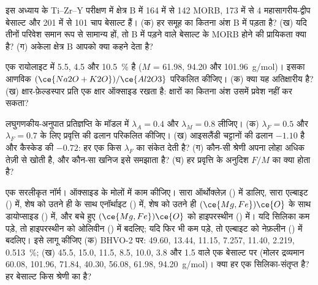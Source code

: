 \begin{exercise}[$\star\star$]\label{exo:b2:magmatic-series:8}
इस अध्याय के Ti--Zr--Y परीक्षण में क्षेत्र B में 164 में से 142 MORB, 173 में से 4
महासागरीय-द्वीप बेसाल्ट और 201 में से 101 चाप बेसाल्ट हैं। (क) हर समूह का कितना अंश
B में पड़ता है? (ख) यदि तीनों परिवेश समान रूप से सामान्य हों, तो B में पड़ने वाले बेसाल्ट के MORB होने की
प्रायिकता क्या है? (ग) अकेला क्षेत्र B आपको क्या कहने देता है?
\end{exercise}

\begin{exercise}[$\star\star$]\label{exo:b2:magmatic-series:9}
एक रायोलाइट में  5.5,  4.5 और  \qty{10.5}{\percent} है ($M$ =
61.98, 94.20 और \qty{101.96}{g/mol})। इसका आणविक $(\ce{Na2O +
K2O})/\ce{Al2O3}$ परिकलित कीजिए। (क) क्या यह अतिक्षारीय है? (ख) क्षार-फ़ेल्डस्पार प्रति  एक
क्षार ऑक्साइड रखता है: क्षारों का कितना अंश उसमें प्रवेश नहीं कर सकता?
\end{exercise}

\begin{exercise}[$\star\star\star$]\label{exo:b2:magmatic-series:10}
लघुगणकीय-अनुपात प्रतिज्ञप्ति के मॉडल में $\lambda_A = 0.4$ और $\lambda_M =
0.8$ लीजिए। (क) $\lambda_F = 0.5$ और $\lambda_F =
0.7$ के लिए प्रवृत्ति की ढलान परिकलित कीजिए। (ख) आइसलैंडी चट्टानों की ढलान $-1.10$ है और कैस्केड की
$-0.72$: हर एक किस $\lambda_F$ का संकेत देती है? (ग) कौन-सी श्रेणी अपना लोहा अधिक तेज़ी से खोती है,
और कौन-सा खनिज इसे समझाता है? (घ) हर प्रवृत्ति के अनुदिश $F/M$ का क्या होता है?
\end{exercise}

\begin{exercise}[$\star\star\star$]\label{exo:b2:magmatic-series:11}
एक सरलीकृत नॉर्म। ऑक्साइड के मोलों में काम कीजिए। सारा  ऑर्थोक्लेज़
() में डालिए, सारा  एल्बाइट () में,
शेष  को उतने ही  के साथ एनॉर्थाइट () में,
शेष  को उतने ही $(\ce{Mg,Fe})\ce{O}$ के साथ डायोप्साइड
() में, और बचे हुए $(\ce{Mg,Fe})\ce{O}$ को हाइपरस्थीन
() में। यदि सिलिका कम पड़े, तो हाइपरस्थीन को ओलिवीन
() में बदलिए; यदि फिर भी कम पड़े, तो एल्बाइट को नेफ़लीन
() में बदलिए। इसे लागू कीजिए (क) BHVO-2 पर:  49.60,  13.44,
 11.15,  7.257,  11.40,  2.219, 
\qty{0.513}{\percent}; (ख) 45.5, 15.0, 11.5, 8.5, 10.0, 3.8 और 1.5 वाले एक बेसाल्ट पर (मोलर
द्रव्यमान  60.08,  101.96,  71.84,  40.30, 
56.08,  61.98,  \qty{94.20}{g/mol})। क्या हर एक सिलिका-संतृप्त है?
हर बेसाल्ट किस श्रेणी का है?
\end{exercise}


